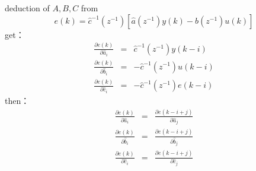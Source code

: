 
\begin{frame}{deduction of $A,B,C$}
from
$$
e(k) = \hat c^{-1}(z^{-1})[\hat a(z^{-1})y(k)-\hat b(z^{-1})u(k)]
$$
get：
\begin{eqnarray*}
\frac{\partial e(k)}{\partial \hat a_i} &=& \hat c^{-1}(z^{-1})y(k-i) \\
\frac{\partial e(k)}{\partial \hat b_i} &=& -\hat c^{-1}(z^{-1})u(k-i) \\
\frac{\partial e(k)}{\partial \hat c_i} &=& -\hat c^{-1}(z^{-1})e(k-i) 
\end{eqnarray*}
then：
\begin{eqnarray*}
\frac{\partial e(k)}{\partial \hat a_i} &=& \frac{\partial e(k-i+j)}{\partial \hat a_j} \\
\frac{\partial e(k)}{\partial \hat b_i} &=& \frac{\partial e(k-i+j)}{\partial \hat b_j} \\
\frac{\partial e(k)}{\partial \hat c_i} &=&  \frac{\partial e(k-i+j)}{\partial \hat c_j} 
\end{eqnarray*}

\end{frame}

